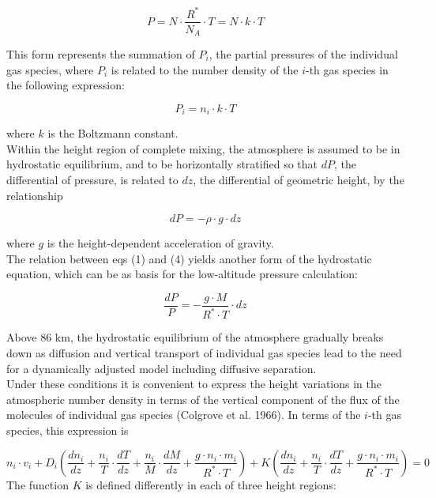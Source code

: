 \documentclass{article}
\begin{document}
\begin{equation}
    P = N \cdot \frac{R^*}{N_A} \cdot T = N \cdot k \cdot T \tag{2}
\end{equation}

This form represents the summation of \(P_i\), the partial pressures of the individual gas species, where \(P_i\) is related to the number density of the \(i\)-th gas species in the following expression:

\begin{equation}
    P_i = n_i \cdot k \cdot T \tag{3}
\end{equation}

where \(k\) is the Boltzmann constant. \\

Within the height region of complete mixing, the atmosphere is assumed to be in hydrostatic equilibrium, and to be horizontally stratified so that \(dP\), the differential of pressure, is related to \(dz\), the differential of geometric height, by the relationship

\begin{equation}
    dP = -\rho \cdot g \cdot dz \tag{4}
\end{equation}

where \(g\) is the height-dependent acceleration of gravity. \\
The relation between eqs (1) and (4) yields another form of the hydrostatic equation, which can be as basis for the low-altitude pressure calculation:

\begin{equation}
\frac{dP}{P} = -\frac{g \cdot M}{R^* \cdot T} \cdot dz \tag{5}
\end{equation}

Above 86 km, the hydrostatic equilibrium of the atmosphere gradually breaks down as diffusion and vertical transport of individual gas species lead to the need for a dynamically adjusted model including diffusive separation. \\
Under these conditions it is convenient to express the height variations in the atmospheric number density in terms of the vertical component of the flux of the molecules of individual gas species (Colgrove et al. 1966). In terms of the \(i\)-th gas species, this expression is

\begin{equation}
  n_i \cdot v_i  + D_i \left ( \frac{dn_i}{dz} + \frac{n_i}{T} \cdot \frac{dT}{dz} + \frac{n_i}{M} \cdot \frac{dM}{dz}  + \frac{g \cdot n_i \cdot m_i}{R^* \cdot T}  \right ) + K \left ( \frac{dn_i}{dz} + \frac{n_i}{T} \cdot \frac{dT}{dz}  + \frac{g \cdot n_i \cdot m_i}{R^* \cdot T} \right ) = 0 \tag{6}
\end{equation}
The function $K$ is defined differently in each of three height regions:
\end{document}
